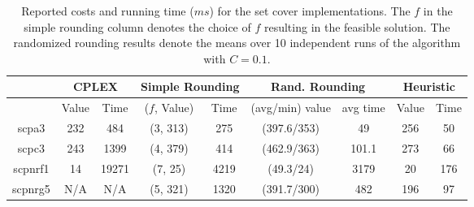 \documentclass[12pt]{article}
\begin{document}
\begin{table}[!hbt]
\center
\begin{tabular}{|c | c | c | c | c | c | c  | c  | c |}
\hline
& \multicolumn{2}{|c|}{CPLEX} & \multicolumn{2}{|c|}{Simple Rounding} & \multicolumn{2}{|c|}{Rand. Rounding} & \multicolumn{2}{|c|}{Heuristic}  \\
\hline
& Value & Time & ($f$, Value) & Time & (avg/min) value & avg time & Value & Time\\
\hline
scpa3 & 232 & 484 & (3, 313) & 275 & (397.6/353) & 49 & 256 & 50\\
\hline
scpc3 & 243 & 1399& (4, 379) & 414 & (462.9/363) & 101.1 & 273 & 66\\
\hline
scpnrf1 & 14 & 19271& (7, 25) & 4219 & (49.3/24) & 3179 & 20 & 176\\
\hline
scpnrg5 & N/A & N/A & (5, 321) & 1320 & (391.7/300) & 482 & 196 & 97\\
\hline 
\end{tabular}
\caption{Reported costs and running time ($ms$) for the set cover implementations. The $f$ in the simple rounding column denotes the choice of $f$ resulting in the feasible solution. The randomized rounding results denote the means over 10 independent runs of the algorithm with $C=0.1$.
\label{times}}
\end{table}
\end{document}
